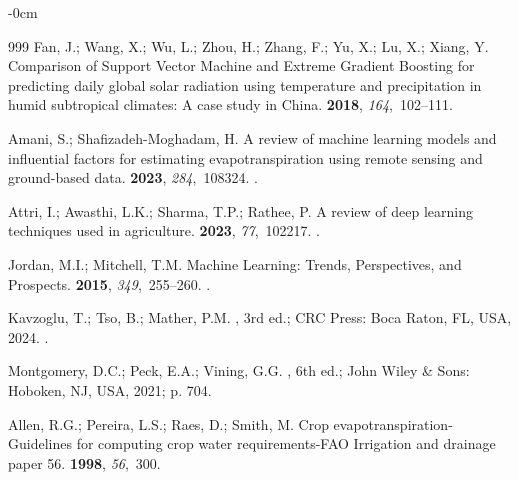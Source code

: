 \documentclass[land,review,accept,pdftex,oneauthor]{Definitions/mdpi}
\begin{document}
\begin{adjustwidth}{-\extralength}{0cm}
\begin{thebibliography}{999}
Fan, J.; Wang, X.; Wu, L.; Zhou, H.; Zhang, F.; Yu, X.; Lu, X.; Xiang, Y.
\newblock Comparison of Support Vector Machine and Extreme Gradient Boosting
  for predicting daily global solar radiation using temperature and
  precipitation in humid subtropical climates: A case study in China.
 {\bf 2018}, {\em
  164},~102--111.

Amani, S.; Shafizadeh-Moghadam, H.
\newblock A review of machine learning models and influential factors for
  estimating evapotranspiration using remote sensing and ground-based data.
 {\bf 2023}, {\em 284},~108324.
.

Attri, I.; Awasthi, L.K.; Sharma, T.P.; Rathee, P.
\newblock A review of deep learning techniques used in agriculture.
 {\bf 2023}, {\em 77},~102217.
.

Jordan, M.I.; Mitchell, T.M.
\newblock Machine Learning: Trends, Perspectives, and Prospects.
 {\bf 2015}, {\em 349},~255--260.
.

Kavzoglu, T.; Tso, B.; Mather, P.M.
, 3rd ed.; CRC
  Press:  Boca Raton, FL, USA, %
  2024.
.

Montgomery, D.C.; Peck, E.A.; Vining, G.G.
, 6th ed.; John Wiley
  \& Sons:  Hoboken, NJ, USA, %
  2021; p. 704.

Allen, R.G.; Pereira, L.S.; Raes, D.; Smith, M.
\newblock Crop evapotranspiration-Guidelines for computing crop water
  requirements-FAO Irrigation and drainage paper 56.
 {\bf 1998}, {\em 56},~300.


\end{thebibliography}
\end{adjustwidth}
\end{document}
